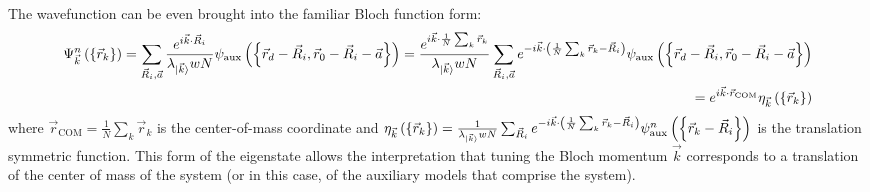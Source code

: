 \documentclass{report}
\numberwithin{equation}{section}
\begin{document}
The wavefunction can be even brought into the familiar Bloch function form:
\begin{equation}\begin{aligned}
	\Psi^n_{\vec k}\left(\left\{\vec r_k\right\}\right) = \sum_{\vec R_i, \vec a} \frac{e^{i \vec{k}\cdot\vec{R}_i}}{\lambda_{\ket{\vec k}} w N} \psi_\text{aux}\left(\left\{ \vec r_d - \vec R_i, \vec r_0 - \vec R_i - \vec a \right\} \right) = \frac{e^{i \vec{k}\cdot\frac{1}{N}\sum_k \vec{r}_k}}{\lambda_{\ket{\vec k}} w N}\sum_{\vec R_i, \vec a} e^{-i \vec{k}\cdot\left(\frac{1}{N}\sum_k\vec r_k - \vec{R}_i\right)} \psi_\text{aux}\left(\left\{ \vec r_d - \vec R_i, \vec r_0 - \vec R_i - \vec a \right\} \right) \\
	= e^{i \vec{k}\cdot\vec{r}_\text{COM}} \eta_{\vec k}\left(\left\{\vec r_k\right\}\right)
\end{aligned}\end{equation}
where \(\vec r_\text{COM} = \frac{1}{N}\sum_k \vec r_k\) is the center-of-mass coordinate and \(\eta_{\vec k}\left(\left\{\vec r_k\right\}\right) = \frac{1}{\lambda_{\ket{\vec k}} w N}\sum_{\vec R_i} e^{-i \vec{k}\cdot\left(\frac{1}{N}\sum_k\vec r_k - \vec{R}_i\right)} \psi^n_\text{aux}\left(\left\{\vec r_k - \vec R_i\right\}\right)\) is the translation symmetric function. This form of the eigenstate allows the interpretation that tuning the Bloch momentum \(\vec k\) corresponds to a translation of the center of mass of the system (or in this case, of the auxiliary models that comprise the system).
\end{document}
